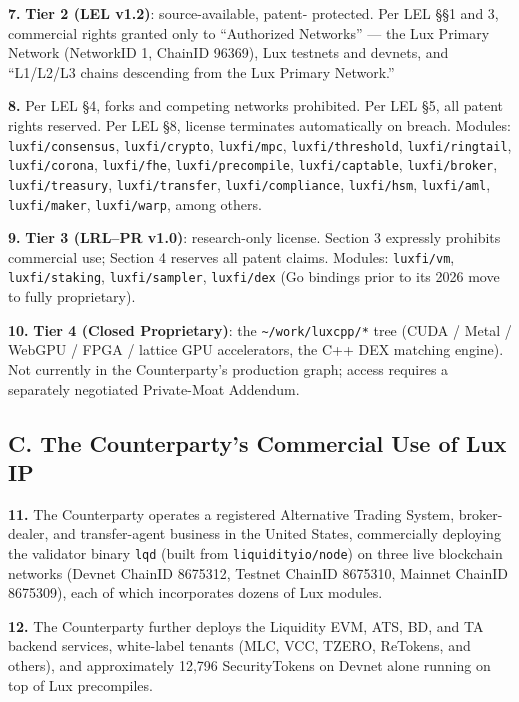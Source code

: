 \documentclass[11pt,letterpaper]{article}
\begin{document}
\textbf{7.} \textbf{Tier 2 (LEL v1.2)}: source-available, patent-
protected. Per LEL \S\S 1 and 3, commercial rights granted only to
``Authorized Networks'' --- the Lux Primary Network (NetworkID 1,
ChainID 96369), Lux testnets and devnets, and ``L1/L2/L3 chains
descending from the Lux Primary Network.''

\textbf{8.} Per LEL \S 4, forks and competing networks prohibited.
Per LEL \S 5, all patent rights reserved. Per LEL \S 8, license
terminates automatically on breach. Modules: \texttt{luxfi/consensus},
\texttt{luxfi/crypto}, \texttt{luxfi/mpc}, \texttt{luxfi/threshold},
\texttt{luxfi/ringtail}, \texttt{luxfi/corona}, \texttt{luxfi/fhe},
\texttt{luxfi/precompile}, \texttt{luxfi/captable},
\texttt{luxfi/broker}, \texttt{luxfi/treasury},
\texttt{luxfi/transfer}, \texttt{luxfi/compliance},
\texttt{luxfi/hsm}, \texttt{luxfi/aml}, \texttt{luxfi/maker},
\texttt{luxfi/warp}, among others.

\textbf{9.} \textbf{Tier 3 (LRL--PR v1.0)}: research-only license.
Section 3 expressly prohibits commercial use; Section 4 reserves all
patent claims. Modules: \texttt{luxfi/vm}, \texttt{luxfi/staking},
\texttt{luxfi/sampler}, \texttt{luxfi/dex} (Go bindings prior to its
2026 move to fully proprietary).

\textbf{10.} \textbf{Tier 4 (Closed Proprietary)}: the
\texttt{\textasciitilde/work/luxcpp/*} tree (CUDA / Metal / WebGPU /
FPGA / lattice GPU accelerators, the C++ DEX matching engine). Not
currently in the Counterparty's production graph; access requires a
separately negotiated Private-Moat Addendum.

\subsection*{C. The Counterparty's Commercial Use of Lux IP}

\textbf{11.} The Counterparty operates a registered Alternative
Trading System, broker-dealer, and transfer-agent business in the
United States, commercially deploying the validator binary
\texttt{lqd} (built from \texttt{liquidityio/node}) on three live
blockchain networks (Devnet ChainID 8675312, Testnet ChainID 8675310,
Mainnet ChainID 8675309), each of which incorporates dozens of Lux
modules.

\textbf{12.} The Counterparty further deploys the Liquidity EVM,
ATS, BD, and TA backend services, white-label tenants (MLC, VCC,
TZERO, ReTokens, and others), and approximately 12,796 SecurityTokens
on Devnet alone running on top of Lux precompiles.
\end{document}
